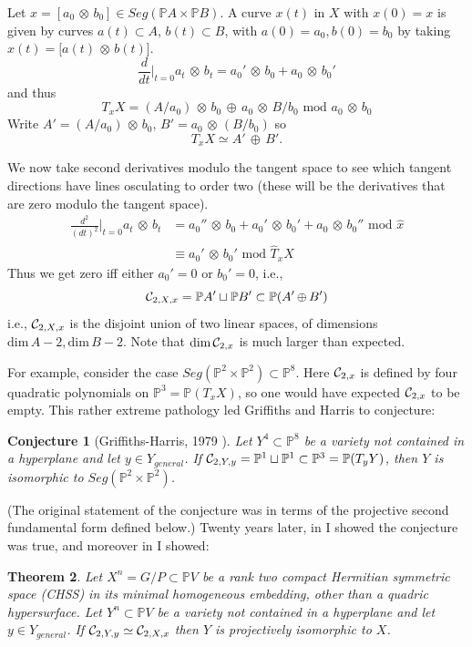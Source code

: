 \documentclass[11pt]{amsart}
\newtheorem{theorem}{Theorem}[section]
\newtheorem{conjecture}[theorem]{Conjecture}
\theoremstyle{definition}
\theoremstyle{remark}
\numberwithin{equation}{section}
\def\BP{\mathbb P}
\def\pp#1{\mathbb P^{#1}}
\def\pp#1{{\mathbb P}^{#1}}
\def\tdim{\rm dim}
\def\ot{{\mathord{\,\otimes }\,}}
\def\op{{\mathord{\,\oplus }\,}}
\def\tdim{\text{dim}\,}
\def\tmod{\text{ mod }}
\begin{document}
Let $x=[a_0\ot b_0]\in Seg(\BP A\times \BP B)$. A curve $x(t)$ in $X$
with $x(0)=x$
is given by curves $a(t)\subset A$, $b(t)\subset B$, with
$a(0)=a_0,b(0)=b_0$ by taking $x(t)=[a(t)\ot b(t)$]. 
$$
\frac d{dt}|_{t=0}a_t\ot b_t= a_0'\ot b_0 + a_0\ot b_0'
$$
and thus
$$
T_xX = (A/a_0)\ot b_0 \op a_0\ot B/b_0 \tmod a_0\ot b_0
$$
Write $A'=(A/a_0)\ot b_0$, $B'=  a_0\ot (B/b_0)$ so
$$T_xX\simeq A'\op B'.
$$

We now take second derivatives modulo the tangent space to see which tangent directions
have lines osculating to order two (these will be the derivatives that
are zero modulo the tangent space).
\begin{align}
\frac {d^2}{(dt)^2}|_{t=0}a_t\ot b_t&=
a_0''\ot b_0 + a_0'\ot b_0' + a_0\ot b_0'' \tmod \hat x\\
&\equiv a_0'\ot b_0' \tmod \hat T_xX
\end{align}
Thus we get zero iff either $a_0'=0$ or $b_0'=0$, i.e.,
$$
\cC_{2,X,x}= \BP A'\sqcup \BP B'\subset \BP   (A'\op B')
$$
i.e., ${\mathcal C}_{2,X,x}$ is the disjoint union of two linear spaces,
of dimensions $\tdim A-2, \tdim B-2$.
Note that $\tdim \cC_{2,x}$ is much
larger than expected.

For example, consider the case $Seg(\pp 2\times \pp 2)\subset \pp 8$.
Here ${\mathcal C}_{2,x}$ is defined by four quadratic polynomials on
$\pp 3=\BP (T_xX)$, so one would have expected ${\mathcal C}_{2,x}$ to be empty.
This rather extreme pathology led Griffiths and Harris to
conjecture:

\begin{conjecture}[Griffiths-Harris, 1979 \cite{GH}]
Let $Y^4\subset \pp 8$ be a variety not contained in  a hyperplane and let $y\in Y_{general}$.
If $\cC_{2,Y,y}=\pp 1\sqcup \pp 1\subset \pp 3=\BP (T_yY)$, then
$Y$ is isomorphic to $Seg(\pp 2\times \pp 2)$.
\end{conjecture}

(The original statement of the conjecture was in terms of the
projective second fundamental form defined below.)
Twenty years later, in \cite{Lrigid} I showed the conjecture was true, and moreover
in \cite{Lrigid,Lchss} I showed:

\begin{theorem}\label{chssrigid}
Let $X^n=G/P\subset \BP V$ be a rank two compact Hermitian symmetric
space (CHSS) in its minimal homogeneous embedding, other than a quadric
hypersurface. Let $Y^n\subset \BP V$ be a variety not contained
in a hyperplane and let $y\in Y_{general}$.
If ${\mathcal C}_{2,Y,y}\simeq {\mathcal C}_{2,X,x}$ then $Y$ is projectively isomorphic to $X$.
\end{theorem}
\end{document}
